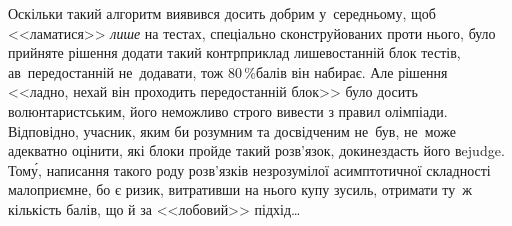 Оскільки такий алгоритм виявився досить добрим у~середньому, щоб <<ламатися>> \emph{лише} на тестах, спеціально сконструйованих проти нього, було прийняте рішення додати такий контрприклад лише\nolinebreak[2] в\nolinebreak[2] останній блок тестів, а\nolinebreak[3] в~передостанній не~додавати, тож 80$\,$\%\nolinebreak[3] балів він набирає.
Але рішення <<ладно, нехай він проходить передостанній блок>> було досить волюнтаристським, його неможливо строго вивести з правил олімпіади. Відповідно, учасник, яким би розумним та досвідченим не~був, не~може адекватно оцінити, які блоки пройде такий розв'язок, доки\nolinebreak[3] не\nolinebreak[3] здасть його в\nolinebreak[3] ejudge. Том\'{у}, написання такого роду розв'язків незрозумілої асимптотичної складності малоприємне, бо є ризик, витративши на нього купу зусиль, отримати ту~ж кількість балів, що й за <<лобовий>> підхід\dots
